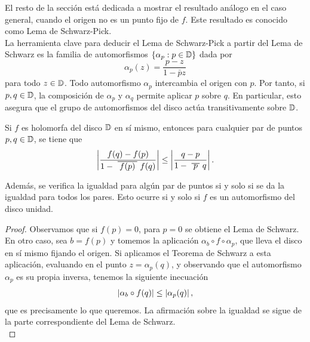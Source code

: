 El resto de la sección está dedicada a mostrar el resultado análogo en el caso general, cuando el origen no es un punto fijo de $f$. Este resultado es conocido como Lema de Schwarz-Pick. \\

La herramienta clave para deducir el Lema de Schwarz-Pick a partir del Lema de Schwarz es la familia de automorfismos $\{\alpha_p: p\in \mathbb{D}\}$ dada por
\begin{equation*}
    \alpha_p (z) = \frac{p-z}{1 - \bar{p}z}
\end{equation*}
para todo $z \in \mathbb{D}$. Todo automorfismo $\alpha_p$ intercambia el origen con $p$. Por tanto, si $p, q \in \mathbb{D}$, la composición de $\alpha_p$ y $\alpha_q$ permite aplicar $p$ sobre $q$. En particular, esto asegura que el grupo de automorfismos del disco actúa transitivamente sobre $\mathbb{D}$. \\

\begin{theorem}
    Si $f$ es holomorfa del disco $\mathbb{D}$ en sí mismo, entonces para cualquier par de puntos $p, q \in \mathbb{D}$, se tiene que
    \begin{equation*}
        \abs{\frac{f(q) - f(p)}{1 - \xbar{f(p)}f(q)}} \leq \abs{\frac{q-p}{1 - \xbar{p}q}}.
    \end{equation*}

    Además, se verifica la igualdad para algún par de puntos si y solo si se da la igualdad para todos los pares. Esto ocurre si y solo si $f$ es un automorfismo del disco unidad.
\end{theorem}

\begin{proof}
    Observamos que si $f(p) = 0$, para $p = 0$ se obtiene el Lema de Schwarz. En otro caso, sea $b = f(p)$ y tomemos la aplicación $\alpha_b \circ f \circ \alpha_p$, que lleva el disco en sí mismo fijando el origen. Si aplicamos el Teorema de Schwarz a esta aplicación, evaluando en el punto $z = \alpha_p(q)$, y observando que el automorfismo $\alpha_p$ es su propia inversa, tenemos la siguiente inecuación
    \begin{equation*}
        \left\lvert\alpha_b \circ f(q)\right\rvert \leq \left\lvert\alpha_p(q)\right\rvert,
    \end{equation*}
    que es precisamente lo que queremos. La afirmación sobre la igualdad se sigue de la parte correspondiente del Lema de Schwarz. \\
\end{proof}

